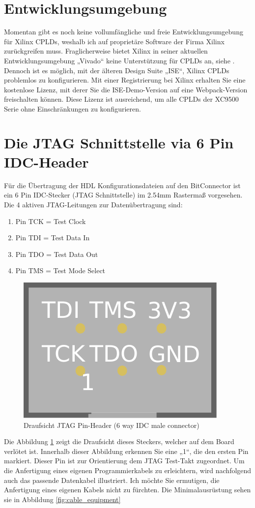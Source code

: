 \documentclass{article}
\begin{document}
{\section{Entwicklungsumgebung}

Momentan gibt es noch keine vollumfängliche und freie \autocite{FSF} Entwicklungsumgebung für Xilinx CPLDs, weshalb ich auf proprietäre Software der Firma Xilinx zurückgreifen muss.
Fraglicherweise bietet Xilinx in seiner aktuellen Entwicklungsumgebung „Vivado“ keine Unterstützung für CPLDs an, siehe \autocite[17]{Vivado}. Dennoch ist es möglich, mit der älteren Design Suite „ISE“, Xilinx CPLDs problemlos zu konfigurieren.
Mit einer Registrierung bei Xilinx erhalten Sie eine kostenlose Lizenz, mit derer Sie die ISE-Demo-Version auf eine Webpack-Version \autocite{ISE-Web} freischalten können. Diese Lizenz ist ausreichend, um alle CPLDs der XC9500 Serie ohne Einschränkungen zu konfigurieren.

\section{Die JTAG Schnittstelle via 6 Pin IDC-Header}

Für die Übertragung der HDL Konfigurationsdateien auf den BitConnector ist ein 6 Pin IDC-Stecker (JTAG Schnittstelle) im 2.54mm Rastermaß vorgesehen. Die 4 aktiven JTAG-Leitungen zur Datenübertragung sind:

\begin{enumerate}
	\item Pin TCK = Test Clock
	\item Pin TDI = Test Data In
	\item Pin TDO = Test Data Out
	\item Pin TMS = Test Mode Select
\end{enumerate}

\begin{figure}[!h]
	\centering
	\includegraphics[width=0.25\linewidth]{Figures/PinHeader6P_male}
	\caption{Draufsicht JTAG Pin-Header (6 way IDC male connector)}
	\label{fig:pinheader}
\end{figure}

\newpage

Die Abbildung \ref{fig:pinheader} zeigt die Draufsicht dieses Steckers, welcher auf dem Board verlötet ist.
Innerhalb dieser Abbildung erkennen Sie eine „1“, die den ersten Pin markiert. Dieser Pin ist zur Orientierung dem JTAG Test-Takt zugeordnet. Um die Anfertigung eines eigenen Programmierkabels zu erleichtern, wird nachfolgend auch das passende Datenkabel illustriert. Ich möchte Sie ermutigen, die Anfertigung eines eigenen Kabels nicht zu fürchten. Die Minimalausrüstung sehen sie in Abbildung \ref{fig:cable_equipment}

}
\end{document}
